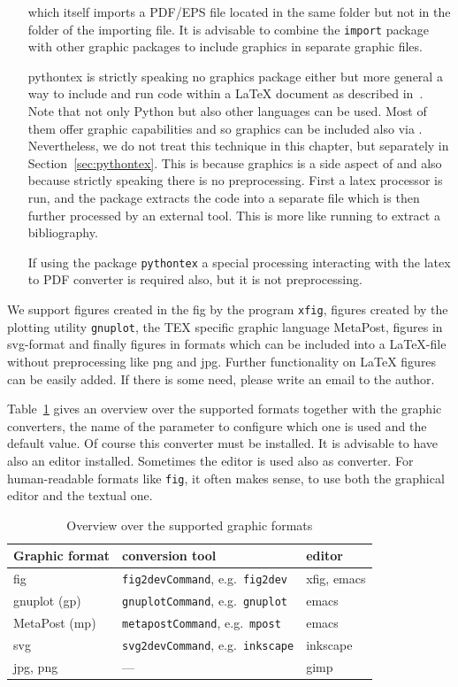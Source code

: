 \begin{itemize}
which itself imports a PDF/EPS file located in the same folder 
but not in the folder of the importing file. 
It is advisable to combine the \texttt{import} package with other graphic packages 
to include graphics in separate graphic files. 
\item[pythontex]
is strictly speaking no graphics package either but more general 
a way to include and run code within a \LaTeX{} document 
as described in~\cite{PythonTexP}. 
Note that not only Python but also other languages can be used. 
Most of them offer graphic capabilities 
and so graphics can be included also via . 
Nevertheless, we do not treat this technique in this chapter, 
but separately in Section~\ref{sec:pythontex}. 
This is because graphics is a side aspect of  
and also because strictly speaking there is no preprocessing. 
First a latex processor is run, and the package extracts the code 
into a separate file which is then further processed by an external tool. 
This is more like running  to extract a bibliography. 

If using the package \texttt{pythontex} 
a special processing interacting with the latex to PDF converter is required also, 
but it is not preprocessing. 
\end{itemize}

We support figures created in the \gls{fig} by the program \texttt{xfig}, 
figures created by the plotting utility \texttt{gnuplot}, 
the TEX specific graphic language MetaPost, 
figures in \gls{svg}-format 
and finally figures in formats which can be included into a \LaTeX-file 
without preprocessing like \gls{png} and \gls{jpg}. 
Further functionality on \LaTeX{} figures can be easily added. 
If there is some need, please write an email to the author. 

Table~\ref{tab:graphicOverview} gives an overview over the supported formats 
together with the graphic converters, 
the name of the parameter to configure which one is used 
and the default value. 
Of course this converter must be installed. 
It is advisable to have also an editor installed. 
Sometimes the editor is used also as converter. 
For human-readable formats like \texttt{fig}, it often makes sense, 
to use both the graphical editor and the textual one. 

\begin{longtable}{|l|ll|}
\toprule
Graphic format & conversion tool & editor \\
\midrule
\midrule
\endfirsthead%
\bottomrule
\caption{\label{tab:graphicOverview} 
Overview over the supported graphic formats }
\endlastfoot%
fig             & \texttt{fig2devCommand}, e.g.~\texttt{fig2dev}  & xfig, emacs   \\
gnuplot (gp)    & \texttt{gnuplotCommand}, e.g.~\texttt{gnuplot}  & emacs         \\
MetaPost (mp)   & \texttt{metapostCommand}, e.g.~\texttt{mpost}   & emacs         \\
svg             & \texttt{svg2devCommand}, e.g.~\texttt{inkscape} & inkscape      \\
jpg, png        & ---        & gimp          \\
\end{longtable}

